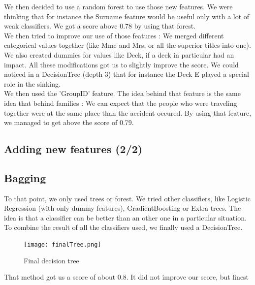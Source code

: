 \documentclass[a4paper,10pt]{report}
\begin{document}
We then decided to use a random forest to use those new features. We were thinking that for instance the Surname feature 
would be useful only with a lot of weak classifiers. We got a score above 0.78 by using that forest. \\
We then tried to improve our use of those features : We merged different categorical values together (like Mme and Mrs, or 
all the superior titles into one). We also created dummies for values like Deck, if a deck in particular had an impact.
All these modifications got us to slightly improve the score. We could noticed in a DecisionTree (depth 3) that for instance the Deck E 
played a special role in the sinking.\\
We then used the 'GroupID' feature. The idea behind that feature is the same idea that behind families : We can expect
that the people who were traveling together were at the same place than the accident occured. By using that feature, we managed
to get above the score of 0.79.

\subsection{Adding new features (2/2)}

\subsection{Bagging}
To that point, we only used trees or forest. We tried other classifiers, like Logistic Regression (with 
only dummy features), GradientBoosting or Extra trees. The idea is that a classifier can be better than 
an other one in a particular situation. To combine the result of all the classifiers used, we finally 
used a DecisionTree.

\begin{figure}[h!]
  \centering
    
      \texttt{[image: finalTree.png]}
  \caption{Final decision tree}
\end{figure}

That method got us a score of about 0.8. It did not improve our score, but finest 
\end{document}
